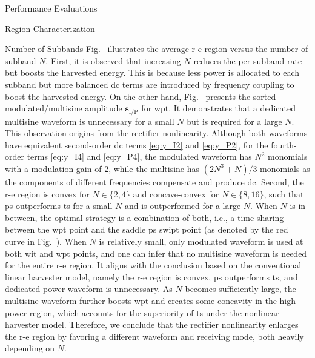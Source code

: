 \begin{section}{Performance Evaluations}
\begin{subsection}{ Region Characterization}
\begin{subsubsection}{Number of Subbands}
			Fig.~ illustrates the average \gls{r-e} region versus the number of subband $N$. First, it is observed that increasing $N$ reduces the per-subband rate but boosts the harvested energy. This is because less power is allocated to each subband but more balanced \gls{dc} terms are introduced by frequency coupling to boost the harvested energy. On the other hand, Fig.~ presents the sorted modulated/multisine amplitude $\mathbf{s}_{\mathrm{I/P}}$ for \gls{wpt}. It demonstrates that a dedicated multisine waveform is unnecessary for a small $N$ but is required for a large $N$. This observation origins from the rectifier nonlinearity. Although both waveforms have equivalent second-order \gls{dc} terms \eqref{eq:y_I2} and \eqref{eq:y_P2}, for the fourth-order terms \eqref{eq:y_I4} and \eqref{eq:y_P4}, the modulated waveform has $N^2$ monomials with a modulation gain of \num{2}, while the multisine has $(2N^3+N)/3$ monomials as the components of different frequencies compensate and produce \gls{dc}. Second, the \gls{r-e} region is convex for $N \in \{2,4\}$ and concave-convex for $N \in \{8,16\}$, such that \gls{ps} outperforms \gls{ts} for a small $N$ and is outperformed for a large $N$. When $N$ is in between, the optimal strategy is a combination of both, i.e., a time sharing between the \gls{wpt} point and the saddle \gls{ps} \gls{swipt} point (as denoted by the red curve in Fig.~). When $N$ is relatively small, only modulated waveform is used at both \gls{wit} and \gls{wpt} points, and one can infer that no multisine waveform is needed for the entire \gls{r-e} region. It aligns with the conclusion based on the conventional linear harvester model, namely the \gls{r-e} region is convex, \gls{ps} outperforms \gls{ts}, and dedicated power waveform is unnecessary. As $N$ becomes sufficiently large, the multisine waveform further boosts \gls{wpt} and creates some concavity in the high-power region, which accounts for the superiority of \gls{ts} under the nonlinear harvester model. Therefore, we conclude that the rectifier nonlinearity enlarges the \gls{r-e} region by favoring a different waveform and receiving mode, both heavily depending on $N$.
		\end{subsubsection}


\end{subsection}
\end{section}
